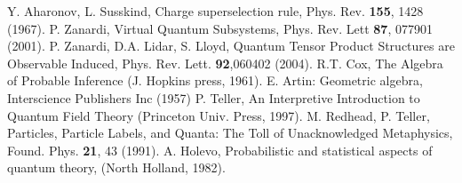\documentclass[aps,prl,amsmath,amssymb,twocolumn,nofootinbib]{revtex4}
\theoremstyle{plain}
\theoremstyle{definition}
\theoremstyle{remark}
\begin{document}
\begin{references}
		Y. Aharonov, L. Susskind, Charge superselection
		rule, Phys. Rev. {\bf 155}, 1428 (1967).
		P. Zanardi, Virtual Quantum Subsystems, Phys. Rev.
		Lett {\bf 87}, 077901 (2001).
		 P. Zanardi, D.A. Lidar, S. Lloyd, Quantum
		Tensor Product Structures are Observable Induced, Phys. Rev. Lett.
		{\bf 92},060402 (2004).
		R.T. Cox, The Algebra of Probable Inference (J. Hopkins
		press, 1961).
		 E. Artin: Geometric algebra, Interscience Publishers Inc (1957)
		P. Teller, An Interpretive Introduction to Quantum
		Field Theory (Princeton Univ. Press, 1997).  
		M. Redhead, P. Teller, Particles, Particle Labels, and
		Quanta: The Toll of Unacknowledged Metaphysics, Found. Phys. {\bf
			21}, 43 (1991).
		A. Holevo, Probabilistic and statistical aspects of
		quantum theory, (North Holland, 1982).
	\end{references}
	
	
	\baselineskip
	
\end{document}
